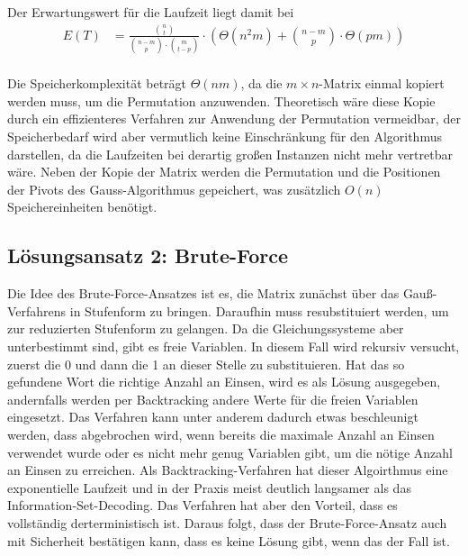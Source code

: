 \documentclass[a4paper,10pt,ngerman]{scrartcl}
\begin{document}
Der Erwartungswert für die Laufzeit liegt damit bei 
\begin{align*}
    E(T) &= \frac{\binom{n}{t}}{\binom{n-m}{p} \cdot \binom{m}{t-p}} \cdot \left(\Theta(n^2m) + \binom{n-m}{p}\cdot \Theta(pm)\right) \\
\end{align*}

Die Speicherkomplexität beträgt $\Theta(nm)$, da die $m \times n$-Matrix einmal kopiert werden muss, um die Permutation anzuwenden. Theoretisch wäre diese Kopie durch ein effizienteres Verfahren zur Anwendung der Permutation vermeidbar, der Speicherbedarf wird aber vermutlich keine Einschränkung für den Algorithmus darstellen, da die Laufzeiten bei derartig großen Instanzen nicht mehr vertretbar wäre. 
Neben der Kopie der Matrix werden die Permutation und die Positionen der Pivots des Gauss-Algorithmus gepeichert, was zusätzlich $O(n)$ Speichereinheiten benötigt. 

\subsection{Lösungsansatz 2: Brute-Force}
Die Idee des Brute-Force-Ansatzes ist es, die Matrix zunächst über das Gauß-Verfahrens in Stufenform zu bringen. Daraufhin muss resubstituiert werden, um zur reduzierten Stufenform zu gelangen. 
Da die Gleichungssysteme aber unterbestimmt sind, gibt es freie Variablen.
In diesem Fall wird rekursiv versucht, zuerst die 0 und dann die 1 an dieser Stelle zu substituieren. 
Hat das so gefundene Wort die richtige Anzahl an Einsen, wird es als Lösung ausgegeben, andernfalls werden per Backtracking andere Werte für die freien Variablen eingesetzt. 
Das Verfahren kann unter anderem dadurch etwas beschleunigt werden, dass abgebrochen wird, wenn bereits die maximale Anzahl an Einsen verwendet wurde oder es nicht mehr genug Variablen gibt, um die nötige Anzahl an Einsen zu erreichen. 
Als Backtracking-Verfahren hat dieser Algoirthmus eine exponentielle Laufzeit und in der Praxis meist deutlich langsamer als das Information-Set-Decoding. 
Das Verfahren hat aber den Vorteil, dass es vollständig derterministisch ist.
Daraus folgt, dass der Brute-Force-Ansatz auch mit Sicherheit bestätigen kann, dass es keine Lösung gibt, wenn das der Fall ist. 

\end{document}
